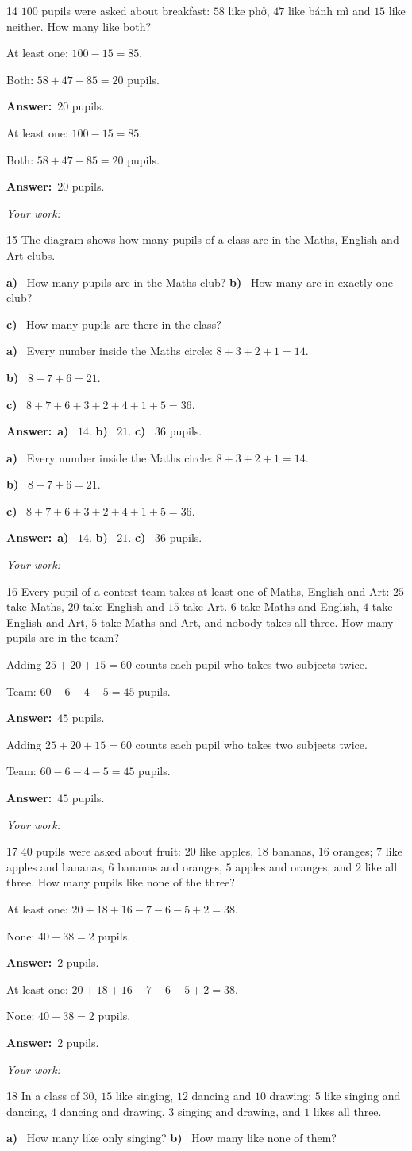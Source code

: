 \documentclass[11pt]{article}
\newif\ifsol \soltrue
\providecommand{\AnsWord}{Đáp số}
\newcommand{\dapso}[1]{\par\textbf{\AnsWord:}\ #1}
\newcommand{\probsol}[1]{%
  \begin{lrbox}{\solmeasure}\begin{minipage}{\dimexpr\linewidth-24pt\relax}#1\end{minipage}\end{lrbox}%
  \ifsol
    \begin{solbox}#1\end{solbox}%
  \else
    \setlength{\solht}{\dimexpr\ht\solmeasure+\dp\solmeasure+0.85cm\relax}%
    \ifdim\solht<1.35cm\setlength{\solht}{1.35cm}\fi
    \begin{tcolorbox}[colback=white,colframe=Line,boxrule=0.8pt,arc=5pt,
      left=8pt,right=8pt,top=4pt,bottom=4pt,height=\solht]{\footnotesize\color{Slate}\itshape\WorkWord}\end{tcolorbox}%
  \fi}
\newcommand{\pa}[1]{\textbf{#1)}\ }
\newcommand{\gap}{\vspace{0.3cm}}
\def\WorkWord{Your work:}
\def\AnsWord{Answer}
\begin{document}
\gap
\begin{probbox}{14}{\relax}
$100$ pupils were asked about breakfast: $58$ like phở, $47$ like bánh mì and $15$ like neither. How many like both?
\end{probbox}
\probsol{
At least one: $100-15=85$.\par Both: $58+47-85=20$ pupils.
\dapso{$20$ pupils.}}
\gap
\needspace{7.5cm}
\begin{probbox}{15}{\relax}
The diagram shows how many pupils of a class are in the Maths, English and Art clubs.
\begin{center}
\end{center}
\pa{a} How many pupils are in the Maths club? \quad \pa{b} How many are in exactly one club?\par
\pa{c} How many pupils are there in the class?
\end{probbox}
\probsol{
\pa{a} Every number inside the Maths circle: $8+3+2+1=14$.\par
\pa{b} $8+7+6=21$.\par
\pa{c} $8+7+6+3+2+4+1+5=36$.
\dapso{\pa{a} $14$. \pa{b} $21$. \pa{c} $36$ pupils.}}
\gap
\begin{probbox}{16}{\relax}
Every pupil of a contest team takes at least one of Maths, English and Art: $25$ take Maths, $20$ take English and $15$ take Art. $6$ take Maths and English, $4$ take English and Art, $5$ take Maths and Art, and nobody takes all three. How many pupils are in the team?
\end{probbox}
\probsol{
Adding $25+20+15=60$ counts each pupil who takes two subjects twice.\par
Team: $60-6-4-5=45$ pupils.
\dapso{$45$ pupils.}}
\gap
\begin{probbox}{17}{\relax}
$40$ pupils were asked about fruit: $20$ like apples, $18$ bananas, $16$ oranges; $7$ like apples and bananas, $6$ bananas and oranges, $5$ apples and oranges, and $2$ like all three. How many pupils like none of the three?
\end{probbox}
\probsol{
At least one: $20+18+16-7-6-5+2=38$.\par None: $40-38=2$ pupils.
\dapso{$2$ pupils.}}
\gap
\begin{probbox}{18}{\relax}
In a class of $30$, $15$ like singing, $12$ dancing and $10$ drawing; $5$ like singing and dancing, $4$ dancing and drawing, $3$ singing and drawing, and $1$ likes all three.\par
\pa{a} How many like only singing? \quad \pa{b} How many like none of them?
\end{probbox}
\end{document}
